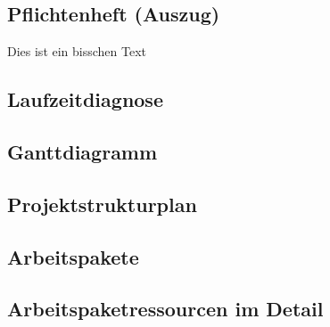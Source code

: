 \documentclass[11pt,toc=sectionentrywithoutdots, 
headheight=44pt, headings=optiontoheadandtoc, hyperfootnotes=false, hypertexnames=false]{scrartcl}
\begin{document}
\subsection{Pflichtenheft (Auszug)}
Dies ist ein bisschen Text

\subsection{Laufzeitdiagnose}
\blindtext

\subsection{Ganttdiagramm}
\blindtext

\subsection{Projektstrukturplan}
\blindtext

\subsection{Arbeitspakete}
\blindtext

\subsection{Arbeitspaketressourcen im Detail}
\blindtext
\end{document}
